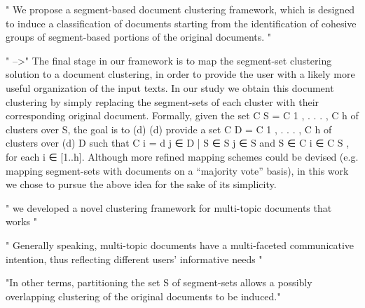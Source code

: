 \cite{Tagarelli2013} 
" We propose a segment-based document clustering framework, which is designed to induce a classification of documents starting from the identification of cohesive groups of segment-based portions of the original documents. "


" -->"
The final stage in our framework is to map the segment-set clustering solution to a document clustering, in order to provide the user with a likely more useful organization of the input texts. In our study we obtain this document clustering by simply replacing the segment-sets of each cluster with their corresponding original document. Formally, given the set C S = {C 1 , . . . , C h } of clusters over S, the goal is to (d) (d) provide a set C D = {C 1 , . . . , C h } of clusters over (d) D such that C i = {d j ∈ D | S ∈ S j ∈ S and S ∈ C i ∈ C S }, for each i ∈ [1..h].  Although more refined mapping schemes could be devised (e.g. mapping segment-sets with documents on a “majority vote” basis), in this work we chose to pursue the above idea for the sake of its simplicity.



" we developed a novel clustering framework for multi-topic documents that works "

" Generally speaking, multi-topic documents have a multi-faceted communicative intention, thus reflecting different users’ informative needs "


"In other terms, partitioning the set S of segment-sets allows a possibly overlapping clustering of the original documents to be induced."

















